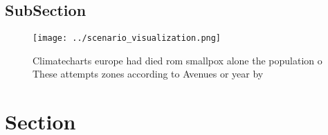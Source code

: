 \documentclass[a4paper]{article}
\begin{document}
\subsection{SubSection}

\begin{figure}
\centering
\texttt{[image: ../scenario\_visualization.png]}
\caption{Climatecharts europe had died rom smallpox alone the population o These attempts zones according to Avenues or year by 
}
\end{figure}
 
\section{Section}
\end{document}
